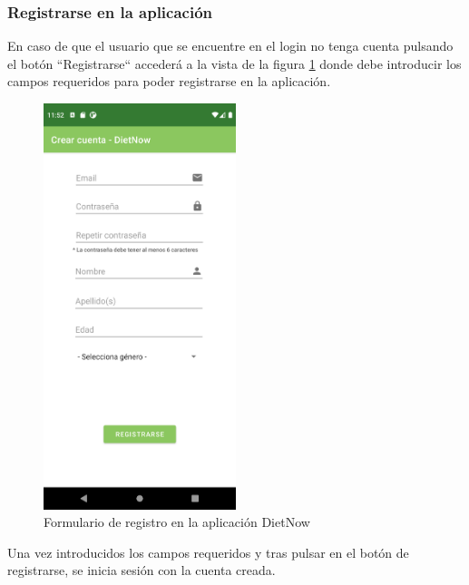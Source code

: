 \subsubsection{Registrarse en la aplicación}
En caso de que el usuario que se encuentre en el login no tenga cuenta pulsando el botón ``Registrarse`` accederá a la vista de la figura \ref{fig:register} donde debe introducir los campos requeridos para poder registrarse en la aplicación.
\begin{figure}[H]
    \centering
    \includegraphics[width=0.5\textwidth]{Images/Capitulo7/register.png}
        \caption{Formulario de registro en la aplicación DietNow}
    \label{fig:register}
\end{figure}
Una vez introducidos los campos requeridos y tras pulsar en el botón de registrarse, se inicia sesión con la cuenta creada.

